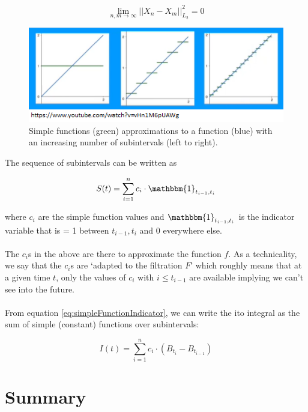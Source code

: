 \documentclass[12pt]{article}
\begin{document}
\begin{equation}
	\lim\limits_{n,m\to\infty}||X_n-X_m||^2_{L_2}=0
\end{equation}

\begin{figure}[h!]
	\centering
	\includegraphics[width=\linewidth]{quantPieScreenShot.png}
	\caption{Simple functions (green) approximations to a function (blue) with an increasing number of subintervals (left to right).}
	\label{fig:quantPieScreenShot}
\end{figure}

\noindent The sequence of subintervals can be written as

\begin{eqnarray}\label{eq:simpleFunctionIndicator}
	S(t)=\sum_{i=1}^{n}c_i\cdot\mathbbm{1}_{t_{i-1}, t_i}
\end{eqnarray}

\noindent where $c_i$ are the simple function values and $\mathbbm{1}_{t_{i-1}, t_i}$ is the indicator variable that is = 1 between ${t_{i-1}, t_i}$ and 0 everywhere else.\\
\\
The $c_i$s in the above are there to approximate the function $f$. As a technicality, we say that the $c_i$s are `adapted to the filtration $F$' which roughly means that at a given time $t$, only the values of $c_i$ with $i\leq t_{i-1}$ are available implying we can't see into the future.\\
\\
From equation \ref{eq:simpleFunctionIndicator}, we can write the ito integral as the sum of simple (constant) functions over subintervals:

\begin{equation}
	I(t)=\sum_{i=1}^{n}c_i\cdot\left(B_{t_i}-B_{t_{i-1}}\right)
\end{equation}






\section{Summary}
\end{document}
